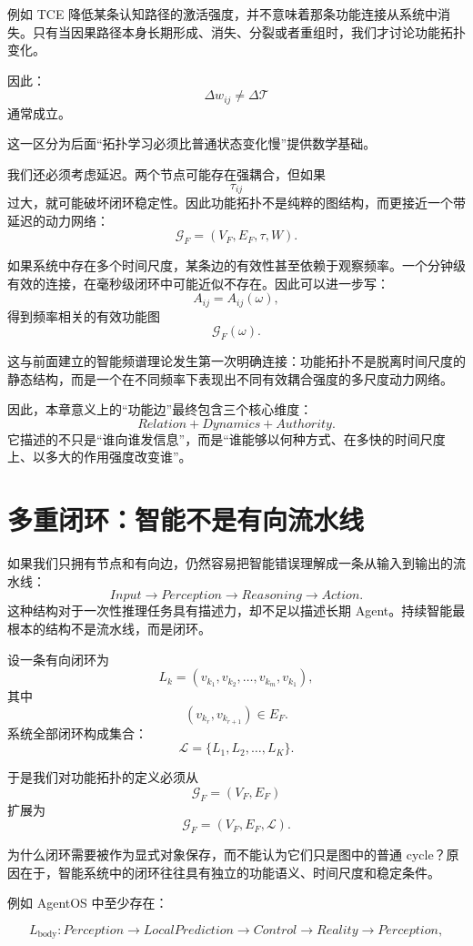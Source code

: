 例如 TCE 降低某条认知路径的激活强度，并不意味着那条功能连接从系统中消失。只有当因果路径本身长期形成、消失、分裂或者重组时，我们才讨论功能拓扑变化。

因此：
\[
\Delta w_{ij}\neq \Delta\mathcal T
\]
通常成立。

这一区分为后面“拓扑学习必须比普通状态变化慢”提供数学基础。

我们还必须考虑延迟。两个节点可能存在强耦合，但如果
\[
\tau_{ij}
\]
过大，就可能破坏闭环稳定性。因此功能拓扑不是纯粹的图结构，而更接近一个带延迟的动力网络：
\[
\mathcal G_F
=
(V_F,E_F,\tau,W).
\]

如果系统中存在多个时间尺度，某条边的有效性甚至依赖于观察频率。一个分钟级有效的连接，在毫秒级闭环中可能近似不存在。因此可以进一步写：
\[
A_{ij}=A_{ij}(\omega),
\]
得到频率相关的有效功能图
\[
\mathcal G_F(\omega).
\]

这与前面建立的智能频谱理论发生第一次明确连接：功能拓扑不是脱离时间尺度的静态结构，而是一个在不同频率下表现出不同有效耦合强度的多尺度动力网络。

因此，本章意义上的“功能边”最终包含三个核心维度：
\[
\boxed{
Relation
+
Dynamics
+
Authority.
}
\]
它描述的不只是“谁向谁发信息”，而是“谁能够以何种方式、在多快的时间尺度上、以多大的作用强度改变谁”。


\section{多重闭环：智能不是有向流水线}

如果我们只拥有节点和有向边，仍然容易把智能错误理解成一条从输入到输出的流水线：
\[
Input
\rightarrow
Perception
\rightarrow
Reasoning
\rightarrow
Action.
\]
这种结构对于一次性推理任务具有描述力，却不足以描述长期 Agent。持续智能最根本的结构不是流水线，而是闭环。

设一条有向闭环为
\[
L_k
=
(v_{k_1},v_{k_2},\ldots,v_{k_m},v_{k_1}),
\]
其中
\[
(v_{k_r},v_{k_{r+1}})\in E_F.
\]
系统全部闭环构成集合：
\[
\mathcal L
=
\{L_1,L_2,\ldots,L_K\}.
\]

于是我们对功能拓扑的定义必须从
\[
\mathcal G_F=(V_F,E_F)
\]
扩展为
\[
\boxed{
\mathcal G_F
=
(V_F,E_F,\mathcal L).
}
\]

为什么闭环需要被作为显式对象保存，而不能认为它们只是图中的普通 cycle？原因在于，智能系统中的闭环往往具有独立的功能语义、时间尺度和稳定条件。

例如 AgentOS 中至少存在：

\[
L_{\mathrm{body}}
:
Perception
\rightarrow
LocalPrediction
\rightarrow
Control
\rightarrow
Reality
\rightarrow
Perception,
\]

